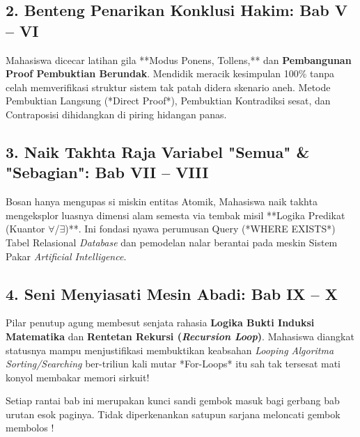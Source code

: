 \subsection{2. Benteng Penarikan Konklusi Hakim: Bab V -- VI}
Mahasiswa dicecar latihan gila **Modus Ponens, Tollens,** dan \textbf{Pembangunan Proof Pembuktian Berundak}. Mendidik meracik kesimpulan 100\% tanpa celah memverifikasi struktur sistem tak patah didera skenario aneh. Metode Pembuktian Langsung (*Direct Proof*), Pembuktian Kontradiksi sesat, dan Contraposisi dihidangkan di piring hidangan panas.

\subsection{3. Naik Takhta Raja Variabel "Semua" \& "Sebagian": Bab VII -- VIII}
Bosan hanya mengupas si miskin entitas Atomik, Mahasiswa naik takhta mengeksplor luasnya dimensi alam semesta via tembak misil **Logika Predikat (Kuantor $\forall$/$\exists$)**. Ini fondasi nyawa perumusan Query (*WHERE EXISTS*) Tabel Relasional \textit{Database} dan pemodelan nalar berantai pada meskin Sistem Pakar \textit{Artificial Intelligence}.

\subsection{4. Seni Menyiasati Mesin Abadi: Bab IX -- X}
Pilar penutup agung membesut senjata rahasia \textbf{Logika Bukti Induksi Matematika} dan \textbf{Rentetan Rekursi (\textit{Recursion Loop})}. Mahasiswa diangkat statusnya mampu menjustifikasi membuktikan keabsahan \textit{Looping Algoritma Sorting/Searching} ber-triliun kali mutar *For-Loops* itu sah tak tersesat mati konyol membakar memori sirkuit!

Setiap rantai bab ini merupakan kunci sandi gembok masuk bagi gerbang bab urutan esok paginya. Tidak diperkenankan satupun sarjana meloncati gembok membolos \cite{levin_discrete,rosen2019}!
